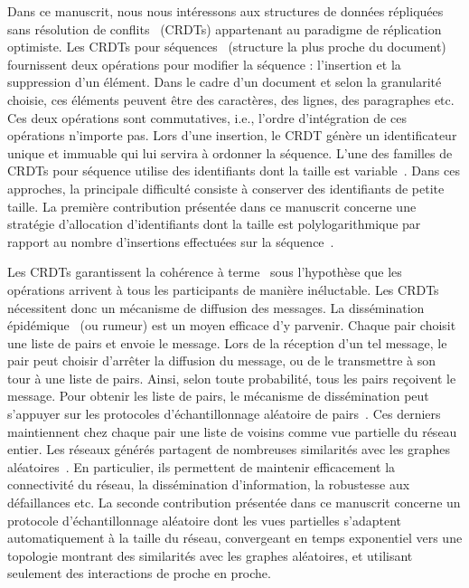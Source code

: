 Dans ce manuscrit, nous nous intéressons aux structures de données répliquées
sans résolution de conflits~\cite{shapiro2011comprehensive, shapiro2011conflict}
(CRDTs) appartenant au paradigme de réplication optimiste. Les CRDTs pour
séquences~\cite{ahmed2011evaluating, conway2014language, grishchenko2010deep,
  oster2006data, preguica2009commutative, roh2011replicated, weiss2007wooki,
  wu2010partial, Yu2012stringwise, andre2013supporting, weiss2009logoot}
(structure la plus proche du document) fournissent deux opérations pour modifier
la séquence : l'insertion et la suppression d'un élément. Dans le cadre d'un
document et selon la granularité choisie, ces éléments peuvent être des
caractères, des lignes, des paragraphes etc. Ces deux opérations sont
commutatives, i.e., l'ordre d'intégration de ces opérations n'importe pas. Lors
d'une insertion, le CRDT génère un identificateur unique et immuable qui lui
servira à ordonner la séquence. L'une des familles de CRDTs pour séquence
utilise des identifiants dont la taille est
variable~\cite{preguica2009commutative,
  andre2013supporting,weiss2009logoot}. Dans ces approches, la principale
difficulté consiste à conserver des identifiants de petite taille. La première
contribution présentée dans ce manuscrit concerne une stratégie d'allocation
d'identifiants dont la taille est polylogarithmique par rapport au nombre
d'insertions effectuées sur la séquence~\cite{nedelec2013lseq,
  nedelec2013concurrency}.

Les CRDTs garantissent la cohérence à terme~\cite{bailis2013eventual} sous
l'hypothèse que les opérations arrivent à tous les participants de manière
inéluctable. Les CRDTs nécessitent donc un mécanisme de diffusion des
messages. La dissémination épidémique~\cite{demers1987epidemic,
  eugster2003lightweight, birman1999bimodal} (ou rumeur) est un moyen efficace
d'y parvenir. Chaque pair choisit une liste de pairs et envoie le message. Lors
de la réception d'un tel message, le pair peut choisir d'arrêter la diffusion du
message, ou de le transmettre à son tour à une liste de pairs. Ainsi, selon
toute probabilité, tous les pairs reçoivent le message. Pour obtenir les liste
de pairs, le mécanisme de dissémination peut s'appuyer sur les protocoles
d'échantillonnage aléatoire de pairs~\cite{jelasity2007gossip,
  voulgaris2005cyclon, ganesh2001scamp, tolgyeski2009adaptive,
  eugster2003lightweight}. Ces derniers maintiennent chez chaque pair une liste
de voisins comme vue partielle du réseau entier. Les réseaux générés partagent
de nombreuses similarités avec les graphes aléatoires~\cite{erdos1959random}. En
particulier, ils permettent de maintenir efficacement la connectivité du réseau,
la dissémination d'information, la robustesse aux défaillances etc. La seconde
contribution présentée dans ce manuscrit concerne un protocole d'échantillonnage
aléatoire dont les vues partielles s'adaptent automatiquement à la taille du
réseau, convergeant en temps exponentiel vers une topologie montrant des
similarités avec les graphes aléatoires, et utilisant seulement des interactions
de proche en proche.


